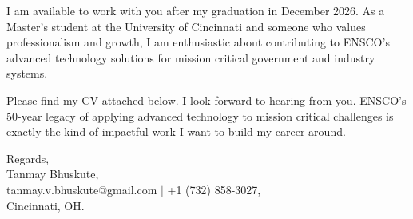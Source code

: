 \documentclass[11pt]{letter}
\begin{document}
\begin{letter}{}
I am available to work with you after my graduation in December 2026. As a Master's student at the University of Cincinnati and someone who values professionalism and growth, I am enthusiastic about contributing to ENSCO's advanced technology solutions for mission critical government and industry systems.

Please find my CV attached below. I look forward to hearing from you. ENSCO's 50-year legacy of applying advanced technology to mission critical challenges is exactly the kind of impactful work I want to build my career around.

{\setlength{\parskip}{0pt}
Regards,\\
Tanmay Bhuskute,\\
tanmay.v.bhuskute@gmail.com $\mid$ +1 (732) 858-3027,\\
Cincinnati, OH.
}

\end{letter}
\end{document}
